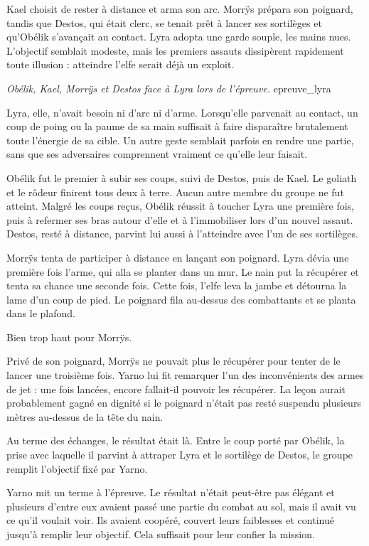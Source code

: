 Kael choisit de rester à distance et arma son arc. Morrÿs prépara son poignard, tandis que Destos, qui était clerc, se tenait prêt à lancer ses sortilèges et qu'Obélik s'avançait au contact. Lyra adopta une garde souple, les mains nues. L'objectif semblait modeste, mais les premiers assauts dissipèrent rapidement toute illusion : atteindre l'elfe serait déjà un exploit.

{\textit{Obélik, Kael, Morrÿs et Destos face à Lyra lors de l'épreuve.}}
{epreuve_lyra}

Lyra, elle, n'avait besoin ni d'arc ni d'arme. Lorsqu'elle parvenait au contact, un coup de poing ou la paume de sa main suffisait à faire disparaître brutalement toute l'énergie de sa cible. Un autre geste semblait parfois en rendre une partie, sans que ses adversaires comprennent vraiment ce qu'elle leur faisait.

Obélik fut le premier à subir ses coups, suivi de Destos, puis de Kael. Le goliath et le rôdeur finirent tous deux à terre. Aucun autre membre du groupe ne fut atteint. Malgré les coups reçus, Obélik réussit à toucher Lyra une première fois, puis à refermer ses bras autour d'elle et à l'immobiliser lors d'un nouvel assaut. Destos, resté à distance, parvint lui aussi à l'atteindre avec l'un de ses sortilèges.

Morrÿs tenta de participer à distance en lançant son poignard. Lyra dévia une première fois l'arme, qui alla se planter dans un mur. Le nain put la récupérer et tenta sa chance une seconde fois. Cette fois, l'elfe leva la jambe et détourna la lame d'un coup de pied. Le poignard fila au-dessus des combattants et se planta dans le plafond.

Bien trop haut pour Morrÿs.

Privé de son poignard, Morrÿs ne pouvait plus le récupérer pour tenter de le lancer une troisième fois. Yarno lui fit remarquer l'un des inconvénients des armes de jet : une fois lancées, encore fallait-il pouvoir les récupérer. La leçon aurait probablement gagné en dignité si le poignard n'était pas resté suspendu plusieurs mètres au-dessus de la tête du nain.

Au terme des échanges, le résultat était là. Entre le coup porté par Obélik, la prise avec laquelle il parvint à attraper Lyra et le sortilège de Destos, le groupe remplit l'objectif fixé par Yarno.

Yarno mit un terme à l'épreuve. Le résultat n'était peut-être pas élégant et plusieurs d'entre eux avaient passé une partie du combat au sol, mais il avait vu ce qu'il voulait voir. Ils avaient coopéré, couvert leurs faiblesses et continué jusqu'à remplir leur objectif. Cela suffisait pour leur confier la mission.

